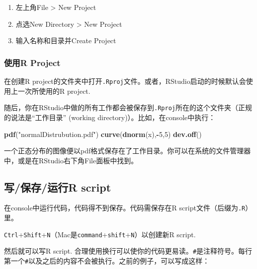 \documentclass[]{book}
\newenvironment{Shaded}{\begin{snugshade}}{\end{snugshade}}
\newcommand{\DecValTok}[1]{\textcolor[rgb]{0.00,0.00,0.81}{#1}}
\newcommand{\KeywordTok}[1]{\textcolor[rgb]{0.13,0.29,0.53}{\textbf{#1}}}
\newcommand{\NormalTok}[1]{#1}
\newcommand{\OperatorTok}[1]{\textcolor[rgb]{0.81,0.36,0.00}{\textbf{#1}}}
\newcommand{\StringTok}[1]{\textcolor[rgb]{0.31,0.60,0.02}{#1}}
\providecommand{\tightlist}{%
  \setlength{\itemsep}{0pt}\setlength{\parskip}{0pt}}
\begin{document}
\begin{enumerate}
\def\labelenumi{\arabic{enumi}.}
\tightlist
\item
  左上角File \textgreater{} New Project
\item
  点选New Directory \textgreater{} New Project
\item
  输入名称和目录并Create Project
\end{enumerate}

\hypertarget{r-project}{%
\subsubsection{使用R Project}\label{r-project}}

在创建R project的文件夹中打开\texttt{.Rproj}文件。或者，RStudio启动的时候默认会使用上一次所使用的R project.

随后，你在RStudio中做的所有工作都会被保存到\texttt{.Rproj}所在的这个文件夹（正规的说法是``工作目录'' (working directory)）。比如，在console中执行：

\begin{Shaded}
\begin{Highlighting}[]
\KeywordTok{pdf}\NormalTok{(}\StringTok{"normalDistrubution.pdf"}\NormalTok{)}
\KeywordTok{curve}\NormalTok{(}\KeywordTok{dnorm}\NormalTok{(x),}\OperatorTok{-}\DecValTok{5}\NormalTok{,}\DecValTok{5}\NormalTok{)}
\KeywordTok{dev.off}\NormalTok{()}
\end{Highlighting}
\end{Shaded}

一个正态分布的图像便以pdf格式保存在了工作目录。你可以在系统的文件管理器中，或是在RStudio右下角File面板中找到。

\hypertarget{r-script}{%
\subsection{写/保存/运行R script}\label{r-script}}

在console中运行代码，代码得不到保存。代码需保存在R script文件（后缀为\texttt{.R}）里。

\texttt{Ctrl}+\texttt{Shift}+\texttt{N}（Mac是\texttt{command}+\texttt{shift}+\texttt{N}）以创建新R script.

然后就可以写R script. 合理使用换行可以使你的代码更易读。\texttt{\#}是注释符号。每行第一个\texttt{\#}以及之后的内容不会被执行。之前的例子，可以写成这样：
\end{document}
